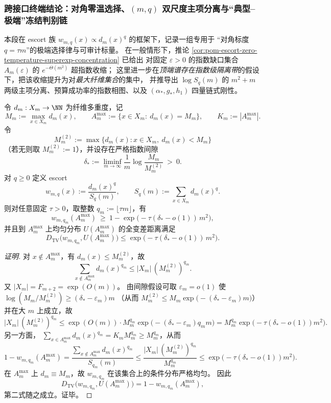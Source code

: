 
\subsubsection{跨接口终端结论：对角零温选择、\texorpdfstring{$(m,q)$}{(m,q)} 双尺度主项分离与“典型--极端”冻结判别链}\label{subsubsec:xi-diagonal-zero-temp-dualscale-freezing}
本段在 escort 族 \(w_{m,q}(x)\propto d_m(x)^q\) 的框架下，记录一组专用于
“对角标度 \(q=\tau m\)”的极端选择律与可审计标量。
在一般情形下，推论 \ref{cor:pom-escort-zero-temperature-superexp-concentration} 已给出
对固定 \(\varepsilon>0\) 的指数缺口集合 \(A_m(\varepsilon)\) 的 \(e^{-\Theta(m^2)}\) 超指数收缩；
这里进一步在\emph{顶端谱存在指数级隔离带}的假设下，把该收缩提升为对\emph{最大纤维集合}的集中，
并推导出 \(\log S_q(m)\) 的 \(m^2+m\) 两级主项分离、预算成功率的指数相图、以及
\((\alpha_\ast,g_\ast,h_1)\) 四量链式刚性。

\begin{conclusion}[对角零温选择原理：\texorpdfstring{$q=\tau m$}{q=tau m} 的 escort 在最大纤维集合上以 \(e^{-\Theta(m^2)}\) 集中]\label{con:xi-terminal-diagonal-zero-temp-maxset-concentration}
令 \(d_m:X_m\to\NN\) 为纤维多重度，记
\[
M_m:=\max_{x\in X_m}d_m(x),\qquad
A_m^{\max}:=\{x\in X_m:\ d_m(x)=M_m\},\qquad
K_m:=|A_m^{\max}|.
\]
令
\[
M_m^{(2)}:=\max\{d_m(x):x\in X_m,\ d_m(x)<M_m\}
\]
（若无则取 \(M_m^{(2)}:=1\)），并设存在严格指数间隙
\[
\delta_\ast:=\liminf_{m\to\infty}\frac{1}{m}\log\frac{M_m}{M_m^{(2)}}\ >\ 0.
\]
对 \(q\ge 0\) 定义 escort
\[
w_{m,q}(x):=\frac{d_m(x)^q}{S_q(m)},\qquad S_q(m):=\sum_{x\in X_m}d_m(x)^q.
\]
则对任意固定 \(\tau>0\)，取整数 \(q_m:=\lfloor \tau m\rfloor\)，有
\[
w_{m,q_m}(A_m^{\max})\ \ge\ 1-\exp\!\bigl(-\tau(\delta_\ast-o(1))\,m^2\bigr),
\]
并且到 \(A_m^{\max}\) 上均匀分布 \(U(A_m^{\max})\) 的全变差距离满足
\[
D_{\mathrm{TV}}\!\bigl(w_{m,q_m},U(A_m^{\max})\bigr)
\le \exp\!\bigl(-\tau(\delta_\ast-o(1))\,m^2\bigr).
\]
\end{conclusion}
\begin{proof}[证明]
对 \(x\notin A_m^{\max}\)，有 \(d_m(x)\le M_m^{(2)}\)，故
\[
\sum_{x\notin A_m^{\max}}d_m(x)^{q_m}\le |X_m|\,(M_m^{(2)})^{q_m}.
\]
又 \(|X_m|=F_{m+2}=\exp(O(m))\)。
由间隙假设可取 \(\varepsilon_m=o(1)\) 使 \(\log(M_m/M_m^{(2)})\ge (\delta_\ast-\varepsilon_m)m\)
（从而 \(M_m^{(2)}\le M_m\exp\bigl(-(\delta_\ast-\varepsilon_m)m\bigr)\)）并在大 \(m\) 上成立，故
\[
|X_m|\,(M_m^{(2)})^{q_m}
\le
\exp(O(m))\cdot M_m^{q_m}\exp\!\bigl(-(\delta_\ast-\varepsilon_m)q_m m\bigr)
=M_m^{q_m}\exp\!\bigl(-\tau(\delta_\ast-o(1))m^2\bigr).
\]
另一方面，
\(
\sum_{x\in A_m^{\max}}d_m(x)^{q_m}=K_m M_m^{q_m}\ge M_m^{q_m}
\)，从而
\[
1-w_{m,q_m}(A_m^{\max})
=\frac{\sum_{x\notin A_m^{\max}}d_m(x)^{q_m}}{S_{q_m}(m)}
\le
\frac{|X_m|\,(M_m^{(2)})^{q_m}}{M_m^{q_m}}
\le \exp\!\bigl(-\tau(\delta_\ast-o(1))m^2\bigr).
\]
在 \(A_m^{\max}\) 上 \(d_m\equiv M_m\)，故 \(w_{m,q_m}\) 在该集合上的条件分布严格均匀。
因此
\[
D_{\mathrm{TV}}\!\bigl(w_{m,q_m},U(A_m^{\max})\bigr)
=1-w_{m,q_m}(A_m^{\max}),
\]
第二式随之成立。证毕。
\end{proof}

